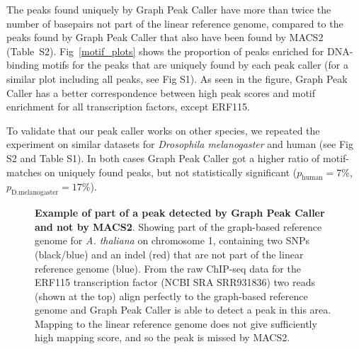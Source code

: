 \documentclass[10pt,letterpaper]{article}
\begin{document}
The peaks found uniquely by Graph Peak Caller have more than twice the number of basepairs not part of the linear reference genome, compared to the peaks found by Graph Peak Caller that also have been found by MACS2 (Table~S2). Fig~\ref{motif_plots} shows the proportion of peaks enriched for DNA-binding motifs for the peaks that are uniquely found by each peak caller (for a similar plot including all peaks, see Fig S1). As seen in the figure, Graph Peak Caller has a better correspondence between high peak scores and motif enrichment for all transcription factors, except ERF115. 


To validate that our peak caller works on other species, we repeated the experiment on similar datasets for \emph{Drosophila melanogaster } and human (see Fig S2 and Table S1). In both cases Graph Peak Caller got a higher ratio of motif-matches on uniquely found peaks, but not statistically significant ($p_{\text{human}}=7\%$, $p_{\text{D.melanogaster}}=17\%$).

\begin{figure}[!h]
 \caption{{\bf Example of part of a peak detected by Graph Peak Caller and not by MACS2}. Showing part of the graph-based reference genome for \emph{A. thaliana} on chromosome 1, containing two SNPs (black/blue) and an indel (red) that are not part of the linear reference genome (blue).
   From the raw ChIP-seq data for the ERF115 transcription factor (NCBI SRA SRR931836) two reads (shown at the top) align perfectly to the graph-based reference genome and Graph Peak Caller is able to detect a peak in this area.
   Mapping to the linear reference genome does not give sufficiently high mapping score, and so the peak is missed by MACS2. }

\label{motif_enrichment_reads}
\end{figure}
\end{document}
